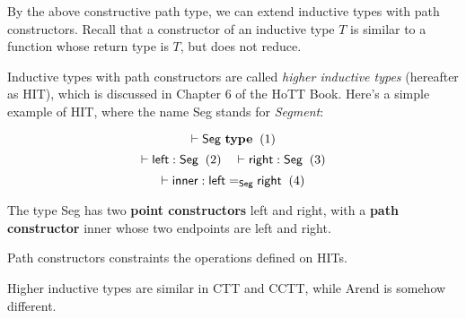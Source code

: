 By the above constructive path type,
we can extend inductive types with path constructors.
Recall that a constructor of an inductive type $T$ is
similar to a function whose return type is $T$,
but does not reduce.

Inductive types with path constructors are called
\textit{higher inductive types} (hereafter as HIT),
which is discussed in Chapter 6 of the HoTT Book.
Here's a simple example of HIT,
where the name \textsf{Seg} stands for \textit{Segment}:

\[
  \vdash \textsf{Seg} \ \textbf{type}
  \xtag
\]
\[
  \vdash \textsf{left} : \textsf{Seg}
  \xtag
  \quad
  \vdash \textsf{right} : \textsf{Seg}
  \xtag
\]
\[
  \vdash \textsf{inner} :
  \textsf{left} =_{\textsf{Seg}} \textsf{right}
  \xtag
\]

The type \textsf{Seg} has two \textbf{point constructors}
\textsf{left} and \textsf{right}, with a \textbf{path constructor}
\textsf{inner} whose two endpoints are \textsf{left} and \textsf{right}.

Path constructors constraints the operations defined on HITs.

Higher inductive types are similar in CTT and CCTT,
while Arend is somehow different.

\TODO